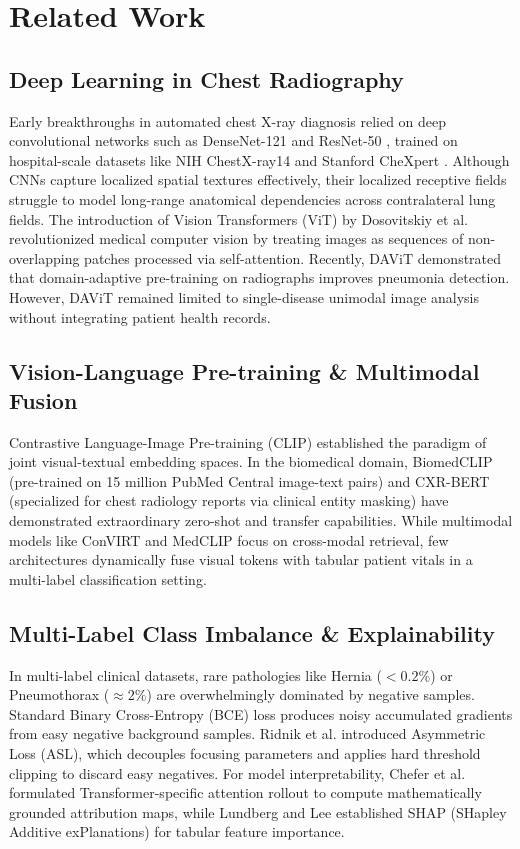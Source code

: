 \documentclass[conference]{IEEEtran}
\begin{document}
\section{Related Work}
\subsection{Deep Learning in Chest Radiography}
Early breakthroughs in automated chest X-ray diagnosis relied on deep convolutional networks such as DenseNet-121 \cite{huang2017} and ResNet-50 \cite{he2016}, trained on hospital-scale datasets like NIH ChestX-ray14 \cite{wang2017} and Stanford CheXpert \cite{irvin2019}. Although CNNs capture localized spatial textures effectively, their localized receptive fields struggle to model long-range anatomical dependencies across contralateral lung fields. The introduction of Vision Transformers (ViT) by Dosovitskiy et al. \cite{dosovitskiy2021} revolutionized medical computer vision by treating images as sequences of non-overlapping patches processed via self-attention. Recently, DAViT \cite{davit2024} demonstrated that domain-adaptive pre-training on radiographs improves pneumonia detection. However, DAViT remained limited to single-disease unimodal image analysis without integrating patient health records.

\subsection{Vision-Language Pre-training \& Multimodal Fusion}
Contrastive Language-Image Pre-training (CLIP) \cite{radford2021} established the paradigm of joint visual-textual embedding spaces. In the biomedical domain, BiomedCLIP \cite{zhang2023} (pre-trained on 15 million PubMed Central image-text pairs) and CXR-BERT \cite{boecking2022} (specialized for chest radiology reports via clinical entity masking) have demonstrated extraordinary zero-shot and transfer capabilities. While multimodal models like ConVIRT \cite{zhang2022convirt} and MedCLIP \cite{wang2022medclip} focus on cross-modal retrieval, few architectures dynamically fuse visual tokens with tabular patient vitals in a multi-label classification setting.

\subsection{Multi-Label Class Imbalance \& Explainability}
In multi-label clinical datasets, rare pathologies like Hernia ($<0.2\%$) or Pneumothorax ($\approx 2\%$) are overwhelmingly dominated by negative samples. Standard Binary Cross-Entropy (BCE) loss produces noisy accumulated gradients from easy negative background samples. Ridnik et al. \cite{ridnik2021} introduced Asymmetric Loss (ASL), which decouples focusing parameters and applies hard threshold clipping to discard easy negatives. For model interpretability, Chefer et al. \cite{chefer2021} formulated Transformer-specific attention rollout to compute mathematically grounded attribution maps, while Lundberg and Lee \cite{lundberg2017} established SHAP (SHapley Additive exPlanations) for tabular feature importance.
\end{document}
